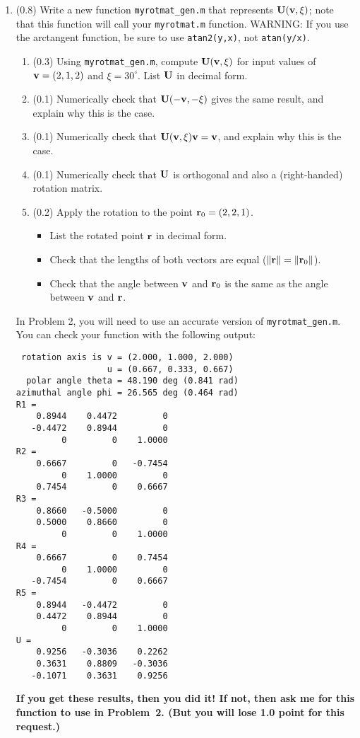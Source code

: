\documentclass[11pt,titlepage,fleqn]{article}
\newcommand{\rotangB}{\xi}    %
\newcommand{\rotvec}{\bv}      %
\begin{document}
\begin{enumerate}
\item (0.8) Write a new function \verb+myrotmat_gen.m+ that represents $\bU(\rotvec,\rotangB)$; note that this function will call your \verb+myrotmat.m+ function. WARNING: If you use the arctangent function, be sure to use \verb+atan2(y,x)+, not \verb+atan(y/x)+.
%
\begin{enumerate}
\item (0.3) Using \verb+myrotmat_gen.m+, compute $\bU(\rotvec,\rotangB)$ for input values of $\rotvec = (2,1,2)$ and $\rotangB = 30^\circ$. List $\mbox{${\bf U}$}$ in decimal form.
\item (0.1) Numerically check that $\bU(-\rotvec,-\rotangB)$ gives the same result, and explain why this is the case.
\item (0.1) Numerically check that $\bU(\rotvec,\rotangB)\rotvec = \rotvec$, and explain why this is the case.
\item (0.1) Numerically check that $\mbox{${\bf U}$}$ is orthogonal and also a (right-handed) rotation matrix.
\item (0.2) Apply the rotation to the point $\mbox{${\bf r}$}_0 = (2,2,1)$.
%
\begin{itemize}
\item List the rotated point $\mbox{${\bf r}$}$ in decimal form.
\item Check that the lengths of both vectors are equal ($\|\mbox{${\bf r}$}\| = \|\mbox{${\bf r}$}_0\|$).
\item Check that the angle between $\rotvec$ and $\mbox{${\bf r}$}_0$ is the same as the angle between  $\rotvec$ and $\mbox{${\bf r}$}$.
\end{itemize}
\end{enumerate}
%
In Problem 2, you will need to use an accurate version of \verb+myrotmat_gen.m+. You can check your function with the following output:
%
\begin{spacing}{1.0}
\begin{verbatim}
 rotation axis is v = (2.000, 1.000, 2.000)
                  u = (0.667, 0.333, 0.667)
  polar angle theta = 48.190 deg (0.841 rad)
azimuthal angle phi = 26.565 deg (0.464 rad)
R1 =
    0.8944    0.4472         0
   -0.4472    0.8944         0
         0         0    1.0000
R2 =
    0.6667         0   -0.7454
         0    1.0000         0
    0.7454         0    0.6667
R3 =
    0.8660   -0.5000         0
    0.5000    0.8660         0
         0         0    1.0000
R4 =
    0.6667         0    0.7454
         0    1.0000         0
   -0.7454         0    0.6667
R5 =
    0.8944   -0.4472         0
    0.4472    0.8944         0
         0         0    1.0000
U =
    0.9256   -0.3036    0.2262
    0.3631    0.8809   -0.3036
   -0.1071    0.3631    0.9256
\end{verbatim}
\end{spacing}
%
{\bf If you get these results, then you did it! If not, then ask me for this function to use in Problem~2. (But you will lose 1.0 point for this request.)}


\end{enumerate}
\end{document}
